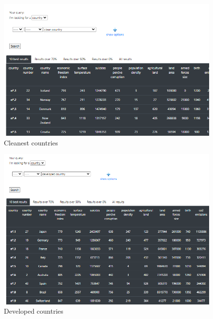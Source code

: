 \documentclass[fleqn,11pt]{article}
\begin{document}
\begin{figure}[H]
    \centering
    \includegraphics[width=\linewidth]{Images/clean_countries.png}
    \caption{Cleanest countries}
\end{figure}
\vspace{-10mm}
\begin{figure}[H]
    \centering
    \includegraphics[width=\linewidth]{Images/developed_country (1).png}
    \caption{Developed countries}
\end{figure}
\end{document}
